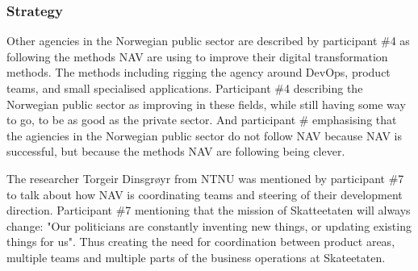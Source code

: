 
\subsubsection{Strategy}
Other agencies in the Norwegian public sector are described by participant \#4 as following the methods NAV are using to improve their digital transformation methods. The methods including rigging the agency around DevOps, product teams, and small specialised applications. Participant \#4 describing the Norwegian public sector as improving in these fields, while still having some way to go, to be as good as the private sector. And participant \# emphasising that the agiencies in the Norwegian public sector do not follow NAV because NAV is successful, but because the methods NAV are following being clever.



The researcher Torgeir Dinsgrøyr from NTNU was mentioned by participant \#7 to talk about how NAV is coordinating teams and steering of their development direction. Participant \#7 mentioning that the mission of Skatteetaten will always change: "Our politicians are constantly inventing new things, or updating existing things for us". Thus creating the need for coordination between product areas, multiple teams and multiple parts of the business operations at Skateetaten.

